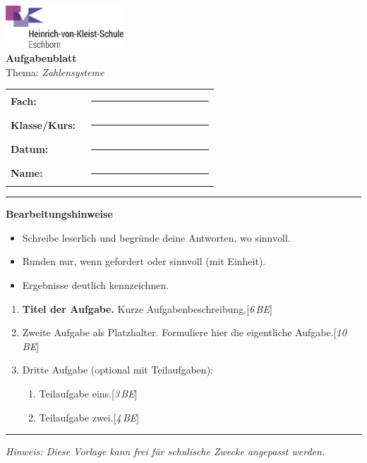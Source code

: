\documentclass[11pt,a4paper]{scrartcl}
\newcommand{\blatttyp}{Aufgabenblatt} %
\newcommand{\thema}{\textit{Zahlensysteme}}
\newcommand{\sheettitle}[2]{%
  \begin{minipage}[t]{0.62\linewidth}
    \includegraphics[height=1.6cm]{hvk-logo.png}\\[0.6em]
    {\Large\bfseries #1}\\[-0.2em]
    {\normalsize #2}
  \end{minipage}\hfill
  \begin{minipage}[t]{0.35\linewidth}
    \renewcommand{\arraystretch}{1.2}
    \begin{tabular}{>{\bfseries}p{0.36\linewidth}p{0.58\linewidth}}
      Fach: & \rule{3.8cm}{0.4pt} \\
      Klasse/Kurs: & \rule{3.8cm}{0.4pt} \\
      Datum: & \rule{3.8cm}{0.4pt} \\
      Name: & \rule{3.8cm}{0.4pt} \\
    \end{tabular}
  \end{minipage}
  \vspace{0.8em}\par\hrule\vspace{1.0em}
}
\newenvironment{aufgaben}{%
  \begin{enumerate}[leftmargin=*,label=\textbf{Aufgabe~\arabic*:}]
}{\end{enumerate}}
\newcommand{\punkte}[1]{\hfill{\small[\textit{#1\,BE}]}}
\newenvironment{hinweise}{%
  \vspace{0.2em}\textbf{Bearbeitungshinweise}\par
  \begin{itemize}[leftmargin=*,topsep=0.3em,itemsep=0.2em]
}{\end{itemize}\vspace{0.5em}}
\begin{document}
\sheettitle{\blatttyp}{Thema: \thema}

\begin{hinweise}
  \item Schreibe leserlich und begründe deine Antworten, wo sinnvoll.
  \item Runden nur, wenn gefordert oder sinnvoll (mit Einheit).
  \item Ergebnisse deutlich kennzeichnen.
\end{hinweise}

\begin{aufgaben}
  \item \textbf{Titel der Aufgabe.} Kurze Aufgabenbeschreibung.\punkte{6}
  
  \vspace{2.5cm} %

  \item Zweite Aufgabe als Platzhalter. Formuliere hier die eigentliche Aufgabe.\punkte{10}

  \vspace{3cm}

  \item Dritte Aufgabe (optional mit Teilaufgaben):
    \begin{enumerate}[label=\alph*)]
      \item Teilaufgabe eins.\punkte{3}
      \item Teilaufgabe zwei.\punkte{4}
    \end{enumerate}
\end{aufgaben}

\vfill
\hrule
\small\emph{Hinweis: Diese Vorlage kann frei für schulische Zwecke angepasst werden.}
\end{document}
